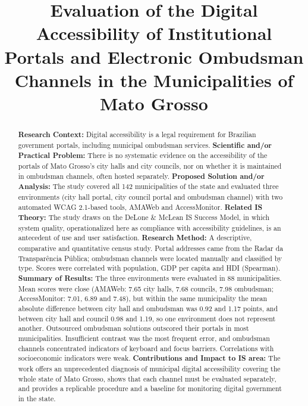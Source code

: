 \documentclass[12pt]{article}
\title{Evaluation of the Digital Accessibility of Institutional Portals and Electronic Ombudsman Channels in the Municipalities of Mato Grosso}
\begin{document}
\maketitle

\begin{abstract}
\textbf{Research Context:} Digital accessibility is a legal requirement for Brazilian government portals, including municipal ombudsman services.
\textbf{Scientific and/or Practical Problem:} There is no systematic evidence on the accessibility of the portals of Mato Grosso's city halls and city councils, nor on whether it is maintained in ombudsman channels, often hosted separately.
\textbf{Proposed Solution and/or Analysis:} The study covered all 142 municipalities of the state and evaluated three environments (city hall portal, city council portal and ombudsman channel) with two automated WCAG 2.1-based tools, AMAWeb and AccessMonitor.
\textbf{Related IS Theory:} The study draws on the DeLone \& McLean IS Success Model, in which system quality, operationalized here as compliance with accessibility guidelines, is an antecedent of use and user satisfaction.
\textbf{Research Method:} A descriptive, comparative and quantitative census study. Portal addresses came from the Radar da Transparência Pública; ombudsman channels were located manually and classified by type. Scores were correlated with population, GDP per capita and HDI (Spearman).
\textbf{Summary of Results:} The three environments were evaluated in 88 municipalities. Mean scores were close (AMAWeb: 7.65 city halls, 7.68 councils, 7.98 ombudsman; AccessMonitor: 7.01, 6.89 and 7.48), but within the same municipality the mean absolute difference between city hall and ombudsman was 0.92 and 1.17 points, and between city hall and council 0.98 and 1.19, so one environment does not represent another. Outsourced ombudsman solutions outscored their portals in most municipalities. Insufficient contrast was the most frequent error, and ombudsman channels concentrated indicators of keyboard and focus barriers. Correlations with socioeconomic indicators were weak.
\textbf{Contributions and Impact to IS area:} The work offers an unprecedented diagnosis of municipal digital accessibility covering the whole state of Mato Grosso, shows that each channel must be evaluated separately, and provides a replicable procedure and a baseline for monitoring digital government in the state.
\end{abstract}
\end{document}
